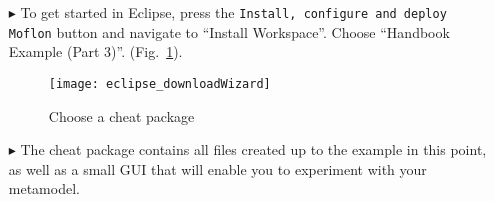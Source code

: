 \begin{itemize}

\item[$\blacktriangleright$] To get started in Eclipse, press the \texttt{Install, configure and deploy Moflon} button and navigate to ``Install Workspace''. Choose ``Handbook Example (Part 3)''.
(Fig.~\ref{eclipse:downloadWizard}).

\begin{figure}[htbp]
	\centering
  \texttt{[image: eclipse\_downloadWizard]}
	\caption{Choose a cheat package}
	\label{eclipse:downloadWizard}
\end{figure}

\item[$\blacktriangleright$] The cheat package contains all files created up to the example in this point, as well as a small GUI that will enable
you to experiment with your metamodel.

\newpage

\vspace*{0.5cm}
%
%
%
\end{itemize}
%
%
%

